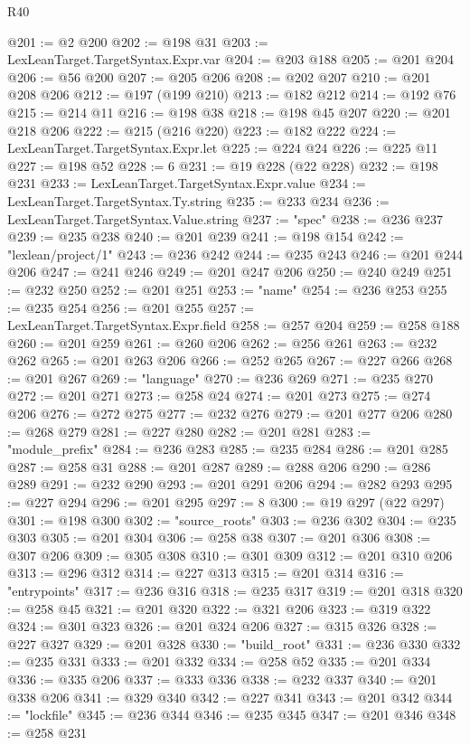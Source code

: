 \begin{lexlean}{R40}
\begin{coremodule}
@201 := @2 @200
@202 := @198 @31
@203 := LexLeanTarget.TargetSyntax.Expr.var
@204 := @203 @188
@205 := @201 @204
@206 := @56 @200
@207 := @205 @206
@208 := @202 @207
@210 := @201 @208 @206
@212 := @197 (@199 @210)
@213 := @182 @212
@214 := @192 @76
@215 := @214 @11
@216 := @198 @38
@218 := @198 @45 @207
@220 := @201 @218 @206
@222 := @215 (@216 @220)
@223 := @182 @222
@224 := LexLeanTarget.TargetSyntax.Expr.let
@225 := @224 @24
@226 := @225 @11
@227 := @198 @52
@228 := 6
@231 := @19 @228 (@22 @228)
@232 := @198 @231
@233 := LexLeanTarget.TargetSyntax.Expr.value
@234 := LexLeanTarget.TargetSyntax.Ty.string
@235 := @233 @234
@236 := LexLeanTarget.TargetSyntax.Value.string
@237 := "spec"
@238 := @236 @237
@239 := @235 @238
@240 := @201 @239
@241 := @198 @154
@242 := "lexlean/project/1"
@243 := @236 @242
@244 := @235 @243
@246 := @201 @244 @206
@247 := @241 @246
@249 := @201 @247 @206
@250 := @240 @249
@251 := @232 @250
@252 := @201 @251
@253 := "name"
@254 := @236 @253
@255 := @235 @254
@256 := @201 @255
@257 := LexLeanTarget.TargetSyntax.Expr.field
@258 := @257 @204
@259 := @258 @188
@260 := @201 @259
@261 := @260 @206
@262 := @256 @261
@263 := @232 @262
@265 := @201 @263 @206
@266 := @252 @265
@267 := @227 @266
@268 := @201 @267
@269 := "language"
@270 := @236 @269
@271 := @235 @270
@272 := @201 @271
@273 := @258 @24
@274 := @201 @273
@275 := @274 @206
@276 := @272 @275
@277 := @232 @276
@279 := @201 @277 @206
@280 := @268 @279
@281 := @227 @280
@282 := @201 @281
@283 := "module_prefix"
@284 := @236 @283
@285 := @235 @284
@286 := @201 @285
@287 := @258 @31
@288 := @201 @287
@289 := @288 @206
@290 := @286 @289
@291 := @232 @290
@293 := @201 @291 @206
@294 := @282 @293
@295 := @227 @294
@296 := @201 @295
@297 := 8
@300 := @19 @297 (@22 @297)
@301 := @198 @300
@302 := "source_roots"
@303 := @236 @302
@304 := @235 @303
@305 := @201 @304
@306 := @258 @38
@307 := @201 @306
@308 := @307 @206
@309 := @305 @308
@310 := @301 @309
@312 := @201 @310 @206
@313 := @296 @312
@314 := @227 @313
@315 := @201 @314
@316 := "entrypoints"
@317 := @236 @316
@318 := @235 @317
@319 := @201 @318
@320 := @258 @45
@321 := @201 @320
@322 := @321 @206
@323 := @319 @322
@324 := @301 @323
@326 := @201 @324 @206
@327 := @315 @326
@328 := @227 @327
@329 := @201 @328
@330 := "build_root"
@331 := @236 @330
@332 := @235 @331
@333 := @201 @332
@334 := @258 @52
@335 := @201 @334
@336 := @335 @206
@337 := @333 @336
@338 := @232 @337
@340 := @201 @338 @206
@341 := @329 @340
@342 := @227 @341
@343 := @201 @342
@344 := "lockfile"
@345 := @236 @344
@346 := @235 @345
@347 := @201 @346
@348 := @258 @231

\end{coremodule}
\end{lexlean}
